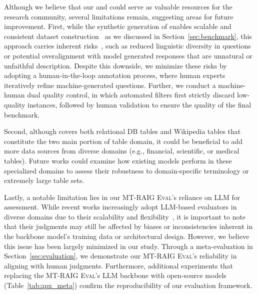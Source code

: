 Although we believe that our \bench and \eval could serve as valuable resources for the research community, several limitations remain, suggesting areas for future improvement.
First, while the synthetic generation of \bench enables scalable and consistent dataset construction~\citep{tan2024largelanguagemodelsdata, hao2024syntheticdataaichallenges,han-etal-2024-rag} as we discussed in Section~\ref{sec:benchmark}, this approach carries inherent risks~\citep{10.1145/3442188.3445922}, such as reduced linguistic diversity in questions or potential overalignment with model generated responses that are unnatural or unfaithful description. 
Despite this downside, we minimize these risks by adopting a human-in-the-loop annotation process, where human experts iteratively refine machine-generated questions. Further, we conduct a machine-human dual quality control, in which automated filters first strictly discard low-quality instances, followed by human validation to ensure the quality of the final benchmark.

Second, although \bench covers both relational DB tables and Wikipedia tables that constitute the two main portion of table domain, it could be beneficial to add more data sources from diverse domains (e.g., financial, scientific, or medical tables).
Future works could examine how existing models perform in these specialized domains to assess their robustness to domain-specific terminology or extremely large table sets.

Lastly, a notable limitation lies in our \textsc{MT-RAIG Eval}’s reliance on LLM for assessment.
While recent works increasingly adopt LLM-based evaluators in diverse domains due to their scalability and flexibility~\citep{ye2024flask,kim2024stopplayingguessinggame, ru2024ragchecker, han-etal-2024-rag, wang-etal-2024-revisiting}, it is important to note that their judgments may still be affected by biases or inconsistencies inherent in the backbone model’s training data or architectural design.
However, we believe this issue has been largely minimized in our study. Through a meta-evaluation in Section~\ref{sec:evaluation}, we demonstrate our \textsc{MT-RAIG Eval}’s reliability in aligning with human judgments. Furthermore, additional experiments that replacing the \textsc{MT-RAIG Eval}'s LLM backbone with open-source models (Table~\ref{tab:apx_meta}) confirm the reproducibility of our evaluation framework.